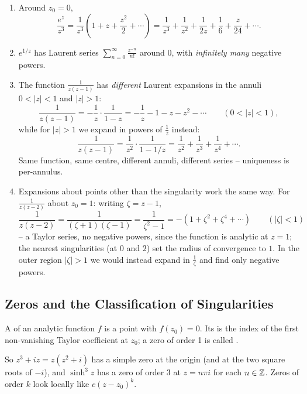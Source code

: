 \documentclass[a4paper]{scrartcl}
\begin{document}
\begin{example}
	\begin{enumerate}[label=(\roman*)]
		\item Around $z_0 = 0$,
		$$
		\frac{e^z}{z^3} = \frac{1}{z^3}\left(1 + z + \frac{z^2}{2} + \cdots\right) = \frac{1}{z^3} + \frac{1}{z^2} + \frac{1}{2z} + \frac{1}{6} + \frac{z}{24} + \cdots.
		$$
		\item $e^{1/z}$ has Laurent series $\sum_{n=0}^\infty \frac{z^{-n}}{n!}$ around $0$, with \emph{infinitely many} negative powers.
		\item The function $\frac{1}{z(z-1)}$ has \emph{different} Laurent expansions in the annuli $0 < |z| < 1$ and $|z| > 1$:
		$$
		\frac{1}{z(z - 1)} = -\frac{1}{z} \cdot \frac{1}{1 - z} = -\frac 1z - 1 - z - z^2 - \cdots \qquad (0 < |z| < 1),
		$$
		while for $|z| > 1$ we expand in powers of $\frac 1z$ instead:
		$$
		\frac{1}{z(z-1)} = \frac{1}{z^2} \cdot \frac{1}{1 - 1/z} = \frac{1}{z^2} + \frac{1}{z^3} + \frac{1}{z^4} + \cdots.
		$$
		Same function, same centre, different annuli, different series -- uniqueness is per-annulus.
		\item Expansions about points other than the singularity work the same way. For $\frac{1}{z(z-2)}$ about $z_0 = 1$: writing $\zeta = z - 1$,
		$$
		\frac{1}{z(z - 2)} = \frac{1}{(\zeta + 1)(\zeta - 1)} = \frac{1}{\zeta^2 - 1} = -\left(1 + \zeta^2 + \zeta^4 + \cdots\right) \qquad (|\zeta| < 1)
		$$
		-- a Taylor series, no negative powers, since the function is analytic at $z = 1$; the nearest singularities (at $0$ and $2$) set the radius of convergence to $1$. In the outer region $|\zeta| > 1$ we would instead expand in $\frac{1}{\zeta}$ and find only negative powers.
	\end{enumerate}
\end{example}

\subsection{Zeros and the Classification of Singularities}

\begin{definition}
	A  of an analytic function $f$ is a point with $f(z_0) = 0$. Its  is the index of the first non-vanishing Taylor coefficient at $z_0$; a zero of order 1 is called .
\end{definition}

So $z^3 + iz = z(z^2 + i)$ has a simple zero at the origin (and at the two square roots of $-i$), and $\sinh^3 z$ has a zero of order 3 at $z = n\pi i$ for each $n \in \mathbb{Z}$. Zeros of order $k$ look locally like $c(z - z_0)^k$.
\end{document}
